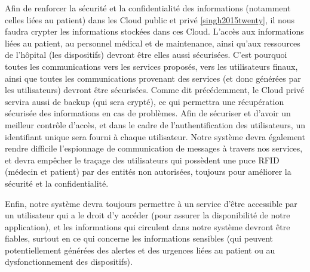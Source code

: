 Afin de renforcer la sécurité et la confidentialité des informations (notamment celles liées au patient) dans les Cloud public et privé \ref{singh2015twenty}, il nous faudra crypter les informations stockées dans ces Cloud. L'accès aux informations liées au patient, au personnel médical et de maintenance, ainsi qu'aux ressources de l'hôpital (les dispositifs) devront être elles aussi sécurisées. C'est pourquoi toutes les communications vers les services proposés, vers les utilisateurs finaux, ainsi que toutes les communications provenant des services (et donc générées par les utilisateurs) devront être sécurisées. Comme dit précédemment, le Cloud privé servira aussi de backup (qui sera crypté), ce qui permettra une récupération sécurisée des informations en cas de problèmes. Afin de sécuriser et d'avoir un meilleur contrôle d'accès, et dans le cadre de l'authentification des utilisateurs, un identifiant unique sera fourni à chaque utilisateur. Notre système devra également rendre difficile l'espionnage de communication de messages à travers nos services, et devra empêcher le traçage des utilisateurs qui possèdent une puce RFID (médecin et patient) par des entités non autorisées, toujours pour améliorer la sécurité et la confidentialité. 

Enfin, notre système devra toujours permettre à un service d'être accessible par un utilisateur qui a le droit d'y accéder (pour assurer la disponibilité de notre application), et les informations qui circulent dans notre système devront être fiables, surtout en ce qui concerne les informations sensibles (qui peuvent potentiellement générées des alertes et des urgences liées au patient ou au dysfonctionnement des dispositifs).
